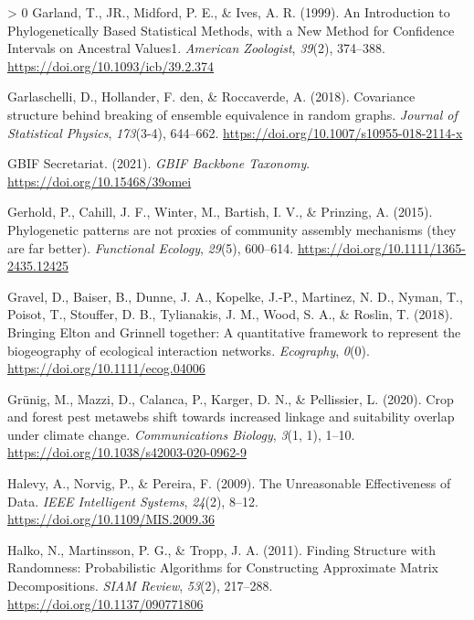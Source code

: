 \documentclass[10pt,oneside]{article}
\newlength{\cslhangindent}
\newenvironment{CSLReferences}[3] %
 {%
  \setlength{\parindent}{0pt}
  \ifodd #1 \everypar{\setlength{\hangindent}{\cslhangindent}}\ignorespaces\fi
  \ifnum #2 > 0
  \setlength{\parskip}{#2\baselineskip}
  \fi
 }%
 {}
\begin{document}
\begin{CSLReferences}{1}{0}
\leavevmode\hypertarget{ref-Garland1999IntPhy}{}%
Garland, T., JR., Midford, P. E., \& Ives, A. R. (1999). An Introduction
to Phylogenetically Based Statistical Methods, with a New Method for
Confidence Intervals on Ancestral Values1. \emph{American Zoologist},
\emph{39}(2), 374--388. \url{https://doi.org/10.1093/icb/39.2.374}

\leavevmode\hypertarget{ref-Garlaschelli2018CovStr}{}%
Garlaschelli, D., Hollander, F. den, \& Roccaverde, A. (2018).
Covariance structure behind breaking of ensemble equivalence in random
graphs. \emph{Journal of Statistical Physics}, \emph{173}(3-4),
644--662. \url{https://doi.org/10.1007/s10955-018-2114-x}

\leavevmode\hypertarget{ref-GBIFSecretariat2021GbiBac}{}%
GBIF Secretariat. (2021). \emph{GBIF Backbone Taxonomy}.
\url{https://doi.org/10.15468/39omei}

\leavevmode\hypertarget{ref-Gerhold2015PhyPat}{}%
Gerhold, P., Cahill, J. F., Winter, M., Bartish, I. V., \& Prinzing, A.
(2015). Phylogenetic patterns are not proxies of community assembly
mechanisms (they are far better). \emph{Functional Ecology},
\emph{29}(5), 600--614. \url{https://doi.org/10.1111/1365-2435.12425}

\leavevmode\hypertarget{ref-Gravel2018BriElt}{}%
Gravel, D., Baiser, B., Dunne, J. A., Kopelke, J.-P., Martinez, N. D.,
Nyman, T., Poisot, T., Stouffer, D. B., Tylianakis, J. M., Wood, S. A.,
\& Roslin, T. (2018). Bringing Elton and Grinnell together: A
quantitative framework to represent the biogeography of ecological
interaction networks. \emph{Ecography}, \emph{0}(0).
\url{https://doi.org/10.1111/ecog.04006}

\leavevmode\hypertarget{ref-Grunig2020CroFor}{}%
Grünig, M., Mazzi, D., Calanca, P., Karger, D. N., \& Pellissier, L.
(2020). Crop and forest pest metawebs shift towards increased linkage
and suitability overlap under climate change. \emph{Communications
Biology}, \emph{3}(1, 1), 1--10.
\url{https://doi.org/10.1038/s42003-020-0962-9}

\leavevmode\hypertarget{ref-Halevy2009UnrEff}{}%
Halevy, A., Norvig, P., \& Pereira, F. (2009). The Unreasonable
Effectiveness of Data. \emph{IEEE Intelligent Systems}, \emph{24}(2),
8--12. \url{https://doi.org/10.1109/MIS.2009.36}

\leavevmode\hypertarget{ref-Halko2011FinStr}{}%
Halko, N., Martinsson, P. G., \& Tropp, J. A. (2011). Finding Structure
with Randomness: Probabilistic Algorithms for Constructing Approximate
Matrix Decompositions. \emph{SIAM Review}, \emph{53}(2), 217--288.
\url{https://doi.org/10.1137/090771806}


\end{CSLReferences}
\end{document}
